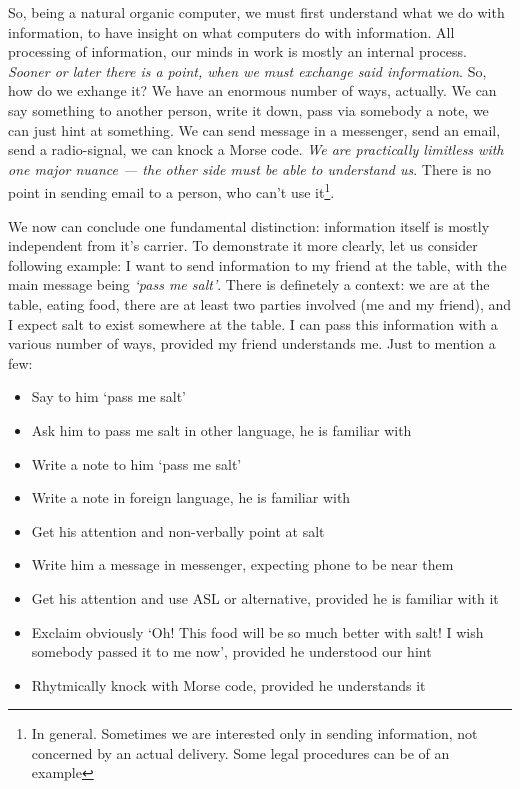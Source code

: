 \documentclass{report}
\begin{document}
            So, being a natural organic computer, we must first understand what we do with information, to have insight on what computers do with information. All processing 
            of information, our minds in work is mostly an internal process. \emph{Sooner or later there is a point, when we must exchange said information}. So, how do we
            exhange it? We have an enormous number of ways, actually. We can say something to another person, write it down, pass via somebody a note, we can just hint at something.
            We can send message in a messenger, send an email, send a radio-signal, we can knock a Morse code. \emph{We are practically limitless with one major nuance --- the other
            side must be able to understand us}. There is no point in sending email to a person, who can't use it\footnote{In general. Sometimes we are interested only
            in sending information, not concerned by an actual delivery. Some legal procedures can be of an example}. \par

            We now can conclude one fundamental distinction: information itself is mostly independent from it's carrier. To demonstrate it more clearly, let us consider
            following example: I want to send information to my friend at the table, with the main message being \emph{`pass me salt'}. There is definetely a context:
            we are at the table, eating food, there are at least two parties involved (me and my friend), and I expect salt to exist somewhere at the table. I can pass this 
            information with a various number of ways, provided my friend understands me. Just to mention a few:

            \begin{itemize}
                \item Say to him `pass me salt'
                \item Ask him to pass me salt in other language, he is familiar with
                \item Write a note to him `pass me salt'
                \item Write a note in foreign language, he is familiar with
                \item Get his attention and non-verbally point at salt
                \item Write him a message in messenger, expecting phone to be near them
                \item Get his attention and use ASL or alternative, provided he is familiar with it
                \item Exclaim obviously `Oh! This food will be so much better with salt! I wish somebody passed it to me now', provided he understood our hint
                \item Rhytmically knock with Morse code, provided he understands it
            \end{itemize}
\end{document}
